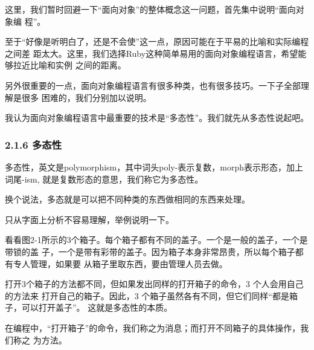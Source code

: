 \documentclass[11pt]{ctexart}
\begin{document}
这里，我们暂时回避一下“面向对象”的整体概念这一问题，首先集中说明“面向对象编
程”。

至于“好像是听明白了，还是不会使”这一点，原因可能在于平易的比喻和实际编程之间差
距太大。这里，我们选择Ruby这种简单易用的面向对象编程语言，希望能够拉近比喻和实例
之间的距离。

另外很重要的一点，面向对象编程语言有很多种类，也有很多技巧。一下子全部理解是很多
困难的，我们分别加以说明。

我认为面向对象编程语言中最重要的技术是“多态性”。我们就先从多态性说起吧。

\subsubsection{2.1.6 多态性}
\label{sec:orgheadline14}

多态性，英文是polymorphism，其中词头poly-表示复数，morph表示形态，加上词尾-ism,
就是复数形态的意思，我们称它为多态性。

换个说法，多态就是可以把不同种类的东西做相同的东西来处理。

只从字面上分析不容易理解，举例说明一下。

看看图2-1所示的3个箱子。每个箱子都有不同的盖子。一个是一般的盖子，一个是带锁的盖
子，一个是带有彩带的盖子。因为箱子本身非常昂贵，所以每个箱子都有专人管理，如果要
从箱子里取东西，要由管理人员去做。

打开3个箱子的方法都不同，但如果发出同样的打开箱子的命令，3 个人会用自己的方法来
打开自己的箱子。因此，3 个箱子虽然各有不同，但它们同样“都是箱子，可以打开盖子”。
这就是多态性的本质。

在编程中，“打开箱子”的命令，我们称之为消息；而打开不同箱子的具体操作，我们称之
为方法。
\end{document}
